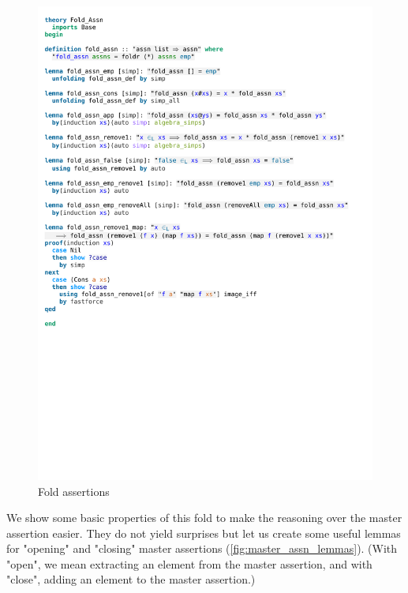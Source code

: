 \begin{figure}[htpb]
    \includegraphics[trim={0 26,3cm 0 2,3cm}, clip, width=1.00\textwidth]{figures/Theory_Fold_Assn.pdf}
    \caption[Fold assertions]{Fold assertions}
    \label{fig:fold_assn}
\end{figure}

\noindent We show some basic properties of this fold to make the reasoning over the master assertion easier. They do not yield surprises but let us create some useful lemmas for "opening" and "closing" master assertions (\autoref{fig:master_assn_lemmas}). (With "open", we mean extracting an element from the master assertion, and with "close", adding an element to the master assertion.)


